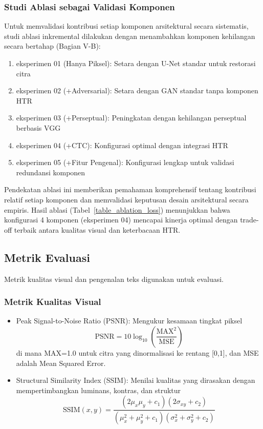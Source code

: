 \documentclass[journal]{IEEEtran}
\begin{document}
\subsubsection{Studi Ablasi sebagai Validasi Komponen}

Untuk memvalidasi kontribusi setiap komponen arsitektural secara sistematis, studi ablasi inkremental dilakukan dengan menambahkan komponen kehilangan secara bertahap (Bagian V-B):

\begin{enumerate}
    \item eksperimen 01 (Hanya Piksel): Setara dengan U-Net standar untuk restorasi citra
    \item eksperimen 02 (+Adversarial): Setara dengan GAN standar tanpa komponen HTR
    \item eksperimen 03 (+Perseptual): Peningkatan dengan kehilangan perseptual berbasis VGG
    \item eksperimen 04 (+CTC): Konfigurasi optimal dengan integrasi HTR
    \item eksperimen 05 (+Fitur Pengenal): Konfigurasi lengkap untuk validasi redundansi komponen
\end{enumerate}

Pendekatan ablasi ini memberikan pemahaman komprehensif tentang kontribusi relatif setiap komponen dan memvalidasi keputusan desain arsitektural secara empiris. Hasil ablasi (Tabel~\ref{table_ablation_loss}) menunjukkan bahwa konfigurasi 4 komponen (eksperimen 04) mencapai kinerja optimal dengan trade-off terbaik antara kualitas visual dan keterbacaan HTR.

\subsection{Metrik Evaluasi}

Metrik kualitas visual dan pengenalan teks digunakan untuk evaluasi.

\subsubsection{Metrik Kualitas Visual}

\begin{itemize}
    \item Peak Signal-to-Noise Ratio (PSNR): Mengukur kesamaan tingkat piksel
    \begin{equation}
    \text{PSNR} = 10 \log_{10}\left(\frac{\text{MAX}^2}{\text{MSE}}\right)
    \end{equation}
    di mana MAX=1.0 untuk citra yang dinormalisasi ke rentang [0,1], dan MSE adalah Mean Squared Error.

    \item Structural Similarity Index (SSIM): Menilai kualitas yang dirasakan dengan mempertimbangkan luminans, kontras, dan struktur~\cite{wang2004ssim}
    \begin{equation}
    \text{SSIM}(x,y) = \frac{(2\mu_x\mu_y + c_1)(2\sigma_{xy} + c_2)}{(\mu_x^2 + \mu_y^2 + c_1)(\sigma_x^2 + \sigma_y^2 + c_2)}
    \end{equation}
\end{itemize}
\end{document}
